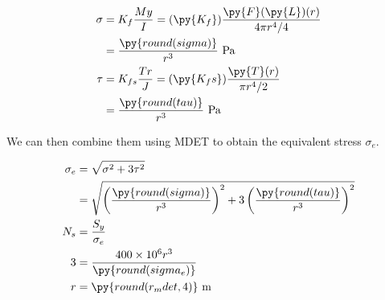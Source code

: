 \documentclass[
10pt,
a4paper,
openany,
svgnames,
]{book}
\begin{document}
\begin{solution}
\begin{enumerate}
      \begin{align*}
        \sigma &= K_{f}\frac{My}{I} = (\py{K_f})\frac{\py{F}(\py{L})(r)}{4 \pi r^{4}/4} \\
               &= \frac{\py{round(sigma)}}{r^{3}} \text{ Pa} \\
        \tau &= K_{fs}\frac{Tr}{J} = (\py{K_fs})\frac{\py{T}(r)}{\pi r^{4}/2} \\
               &= \frac{\py{round(tau)}}{r^{3}} \text{ Pa}
      \end{align*}

      We can then combine them using MDET to obtain the equivalent stress $\sigma_{e}$.

      \begin{align*}
        \sigma_{e} &= \sqrt{ \sigma^{2} + 3 \tau^{2} } \\
                   &= \sqrt{ \left( \frac{\py{round(sigma)}}{r^{3}} \right)^{2} + 3 \left( \frac{\py{round(tau)}}{r^{3}} \right)^{2} } \\
        N_{s} &= \frac{S_{y}}{\sigma_{e}} \\
        3 &= \frac{400 \times 10^{6} r^{3}}{\py{round(sigma_e)}} \\
        r &= \py{round(r_mdet,4)} \text{ m}
      \end{align*}


\end{enumerate}
\end{solution}
\end{document}
